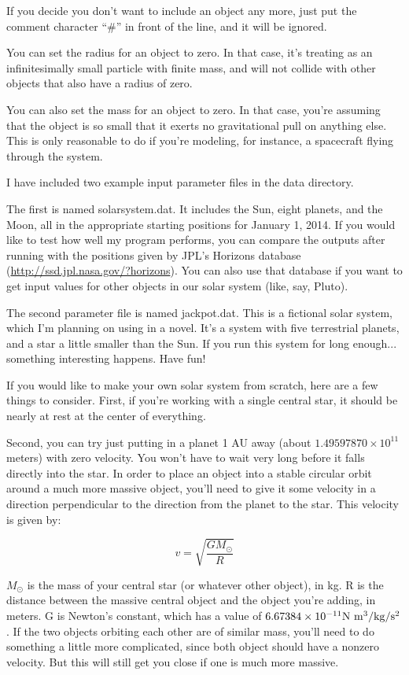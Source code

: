 \documentclass{article}
\begin{document}
If you decide you don't want to include an object any more, just put the comment character ``\#'' in front of the line, and it will be ignored.

You can set the radius for an object to zero.  In that case, it's treating as an infinitesimally small particle with finite mass, and will not collide with other objects that also have a radius of zero.

You can also set the mass for an object to zero.  In that case, you're assuming that the object is so small that it exerts no gravitational pull on anything else.  This is only reasonable to do if you're modeling, for instance, a spacecraft flying through the system.

I have included two example input parameter files in the data directory.

The first is named solarsystem.dat.  It includes the Sun, eight planets, and the Moon, all in the appropriate starting positions for January 1, 2014.  If you would like to test how well my program performs, you can compare the outputs after running with the positions given by JPL's Horizons database (\url{http://ssd.jpl.nasa.gov/?horizons}).  You can also use that database if you want to get input values for other objects in our solar system (like, say, Pluto).

The second parameter file is named jackpot.dat.  This is a fictional solar system, which I'm planning on using in a novel.  It's a system with five terrestrial planets, and a star a little smaller than the Sun.  If you run this system for long enough... something interesting happens.  Have fun!

If you would like to make your own solar system from scratch, here are a few things to consider.  First, if you're working with a single central star, it should be nearly at rest at the center of everything.

Second, you can try just putting in a planet 1 AU away (about $1.49597870\times10^{11}$ meters) with zero velocity.  You won't have to wait very long before it falls directly into the star.  In order to place an object into a stable circular orbit around a much more massive object, you'll need to give it some velocity in a direction perpendicular to the direction from the planet to the star.  This velocity is given by:

\begin{equation}
	v = \sqrt{\frac{G M_\odot}{R}}
\end{equation}

$M_\odot$ is the mass of your central star (or whatever other object), in kg.  R is the distance between the massive central object and the object you're adding, in meters.  G is Newton's constant, which has a value of $6.67384\times10^{-11} \rm{N~m^3/kg/s^2}$.  If the two objects orbiting each other are of similar mass, you'll need to do something a little more complicated, since both object should have a nonzero velocity.  But this will still get you close if one is much more massive.
\end{document}
